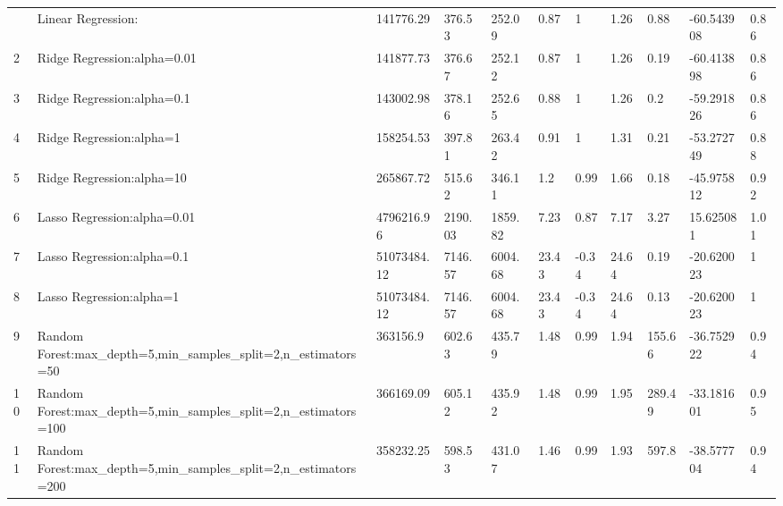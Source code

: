 \begin{longtable}{C{0.8cm} L{2cm} C{1.15cm} C{1.15cm} C{1.15cm} C{1.15cm} C{0.85cm} C{1.25cm} C{1.2cm} C{1.5cm} C{1.0cm}}
\bottomrule
{} & Linear Regression:\newline  & 141776.29 & 376.53 & 252.09 & 0.87 & 1 & 1.26 & 0.88 & -60.543908 & 0.86 \\
2 & Ridge Regression:\newline alpha=0.01 & 141877.73 & 376.67 & 252.12 & 0.87 & 1 & 1.26 & 0.19 & -60.413898 & 0.86 \\
3 & Ridge Regression:\newline alpha=0.1 & 143002.98 & 378.16 & 252.65 & 0.88 & 1 & 1.26 & 0.2 & -59.291826 & 0.86 \\
4 & Ridge Regression:\newline alpha=1 & 158254.53 & 397.81 & 263.42 & 0.91 & 1 & 1.31 & 0.21 & -53.272749 & 0.88 \\
5 & Ridge Regression:\newline alpha=10 & 265867.72 & 515.62 & 346.11 & 1.2 & 0.99 & 1.66 & 0.18 & -45.975812 & 0.92 \\
6 & Lasso Regression:\newline alpha=0.01 & 4796216.96 & 2190.03 & 1859.82 & 7.23 & 0.87 & 7.17 & 3.27 & 15.625081 & 1.01 \\
7 & Lasso Regression:\newline alpha=0.1 & 51073484.12 & 7146.57 & 6004.68 & 23.43 & -0.34 & 24.64 & 0.19 & -20.620023 & 1 \\
8 & Lasso Regression:\newline alpha=1 & 51073484.12 & 7146.57 & 6004.68 & 23.43 & -0.34 & 24.64 & 0.13 & -20.620023 & 1 \\
9 & Random Forest:\newline max\_depth=5,\newline min\_samples\_split=2,\newline n\_estimators=50 & 363156.9 & 602.63 & 435.79 & 1.48 & 0.99 & 1.94 & 155.66 & -36.752922 & 0.94 \\
10 & Random Forest:\newline max\_depth=5,\newline min\_samples\_split=2,\newline n\_estimators=100 & 366169.09 & 605.12 & 435.92 & 1.48 & 0.99 & 1.95 & 289.49 & -33.181601 & 0.95 \\
11 & Random Forest:\newline max\_depth=5,\newline min\_samples\_split=2,\newline n\_estimators=200 & 358232.25 & 598.53 & 431.07 & 1.46 & 0.99 & 1.93 & 597.8 & -38.577704 & 0.94 \\

\end{longtable}
